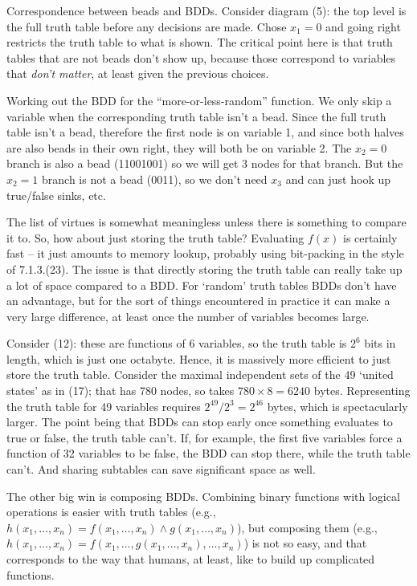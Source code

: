   Correspondence between beads and BDDs.\hfil\break
Consider diagram (5): the top level is the full truth table before any
decisions are made.  Chose $x_1 = 0$ and going right restricts
the truth table to what is shown.  The critical point here is that truth
tables that are not beads don't show up, because those correspond
to variables that {\it don't matter}, at least given the previous choices.

 Working out the BDD for the ``more-or-less-random''
function.\hfil\break
We only skip a variable when the corresponding truth table isn't a bead.  Since
the full truth table isn't a bead, therefore the first node is on variable 1, and
since both halves are also beads in their own right, they will both be on
variable 2.  The $x_2 = 0$ branch is also a bead (11001001) so we will
get 3 nodes for that branch.  But the $x_2 = 1$ branch is not a bead
(0011), so we don't need $x_3$ and can just hook up true/false sinks, etc.


\noindent [p 206] The list of virtues is somewhat meaningless unless there is something
to compare it to.  So, how about just storing the truth table?  Evaluating
$f\left(x\right)$ is certainly fast -- it just amounts to memory lookup, probably
using bit-packing in the style of 7.1.3.(23).  The issue is that directly
storing the truth table can really take up a lot of space compared to a BDD.
For `random' truth tables BDDs don't have an advantage, but for the
sort of things encountered in practice it can make a very large difference,
at least once the number of variables becomes large.  

Consider (12): these are functions of 6 variables, so the truth table is $2^6$ bits
in length, which is just one octabyte.  Hence, it is massively more efficient
to just store the truth table.  Consider the maximal independent sets of the
49 `united states' as in (17); that has 780 nodes, so takes $780 \times 8 = 6240$
bytes.  Representing the truth table for 49 variables requires $2^49 / 2^3 = 2^46$
bytes, which is spectacularly larger.  The point being that BDDs can stop early
once something evaluates to true or false, the truth table can't.  If, for example,
the first five variables force a function of 32 variables to be false, the BDD
can stop there, while the truth table can't.  And sharing subtables can save
significant space as well.

The other big win is composing BDDs.  Combining binary functions with
logical operations is easier with truth tables (e.g., $h\left(x_1, \ldots, x_n\right)
= f\left(x_1, \ldots, x_n\right) \land g\left(x_1, \ldots, x_n\right)$), but
composing them (e.g., $h\left(x_1, \ldots, x_n\right) = f\left(x_1, \ldots,
g\left(x_1, \ldots, x_n\right), \ldots, x_n\right)$) is not so easy, and 
that corresponds to the way that humans, at least, like to build up complicated
functions.

